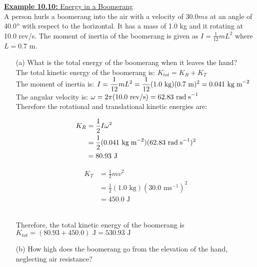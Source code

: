 \documentclass[a4paper]{article}
\let\bf\textbf
\newcommand\rads{\text{ rad\;s}^{-1}}
\newcommand\m{\text{ m}}
\newcommand\J{\text{ J}}
\newcommand\ms{\text{ ms}^{-1}}
\newcommand\kg{\text{ kg}}
\newcommand\kgmm{\text{ kg\;m}^{-2}}
\begin{document}
\begin{shaded}
    \underline{\bf{Example 10.10:} Energy in a Boomerang}
    \vspace{2mm}\\
    A person hurls a boomerang into the air with a velocity of 30.0$ms$ at an angle of 40.0$\degree$ with respect to the horizontal. It has a mass of 1.0 kg and it rotating at 10.0 rev/s. The moment of inertia of the boomerang is given as $I = \frac{1}{12}mL^2$ where $L = 0.7\m$. 
    \begin{enumerate}
        \item[(a)] What is the total energy of the boomerang when it leaves the hand?
        \vspace{1mm}\\
        The total kinetic energy of the boomerang is: $K_{tot} = K_R + K_T$\\
        The moment of inertia is: $\displaystyle I = \frac{1}{12}mL^2 = \frac{1}{12}(1.0\kg)(0.7\m)^2 = 0.041\kgmm$\\
        The angular velocity is: $\omega = 2\pi(10.0\text{ rev/s}) = 62.83\rads$\\
        Therefore the rotational and translational kinetic energies are:\\
        \begin{minipage}{0.4\textwidth}
            \begin{align*}
                K_R &= \frac{1}{2}I\omega^2\\
                &= \frac{1}{2}(0.041\kgmm)(62.83\rads)^2\\
                &= 80.93\J
            \end{align*}            
        \end{minipage}
        \begin{minipage}{0.4\textwidth}
            \begin{align*}
                K_T &= \frac{1}{2}mv^2\\
                &= \frac{1}{2}(1.0\kg)(30.0\ms)^2\\
                &= 450.0\J
            \end{align*}
        \end{minipage}\\
        Therefore, the total kinetic energy of the boomerang is $\displaystyle K_{tot} = (80.93 + 450.0)\J = 530.93\J$
        \item[(b)] How high does the boomerang go from the elevation of the hand, neglecting air resistance?
        \vspace{1mm}\\

\end{enumerate}
\end{shaded}
\end{document}
